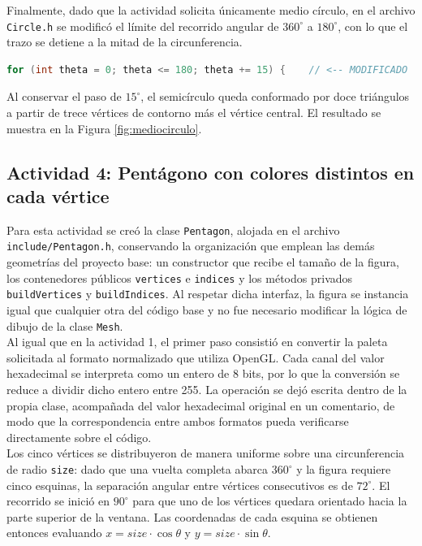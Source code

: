 Finalmente, dado que la actividad solicita únicamente medio círculo, en el archivo \texttt{Circle.h} se modificó el límite del recorrido angular de $360^\circ$ a $180^\circ$, con lo que el trazo se detiene a la mitad de la circunferencia.\\

\begin{lstlisting}[language=C++, caption={Modificación del recorrido angular en Circle.h.}]
for (int theta = 0; theta <= 180; theta += 15) {    // <-- MODIFICADO
\end{lstlisting}

Al conservar el paso de $15^\circ$, el semicírculo queda conformado por doce triángulos a partir de trece vértices de contorno más el vértice central. El resultado se muestra en la Figura \ref{fig:mediocirculo}.\\

\subsection{Actividad 4: Pentágono con colores distintos en cada vértice}

Para esta actividad se creó la clase \texttt{Pentagon}, alojada en el archivo \texttt{include/Pentagon.h}, conservando la organización que emplean las demás geometrías del proyecto base: un constructor que recibe el tamaño de la figura, los contenedores públicos \texttt{vertices} e \texttt{indices} y los métodos privados \texttt{buildVertices} y \texttt{buildIndices}. Al respetar dicha interfaz, la figura se instancia igual que cualquier otra del código base y no fue necesario modificar la lógica de dibujo de la clase \texttt{Mesh}.\\

Al igual que en la actividad 1, el primer paso consistió en convertir la paleta solicitada al formato normalizado que utiliza OpenGL. Cada canal del valor hexadecimal se interpreta como un entero de 8 bits, por lo que la conversión se reduce a dividir dicho entero entre 255. La operación se dejó escrita dentro de la propia clase, acompañada del valor hexadecimal original en un comentario, de modo que la correspondencia entre ambos formatos pueda verificarse directamente sobre el código.\\

Los cinco vértices se distribuyeron de manera uniforme sobre una circunferencia de radio \texttt{size}: dado que una vuelta completa abarca $360^\circ$ y la figura requiere cinco esquinas, la separación angular entre vértices consecutivos es de $72^\circ$. El recorrido se inició en $90^\circ$ para que uno de los vértices quedara orientado hacia la parte superior de la ventana. Las coordenadas de cada esquina se obtienen entonces evaluando $x = size \cdot \cos\theta$ y $y = size \cdot \sin\theta$.\\

